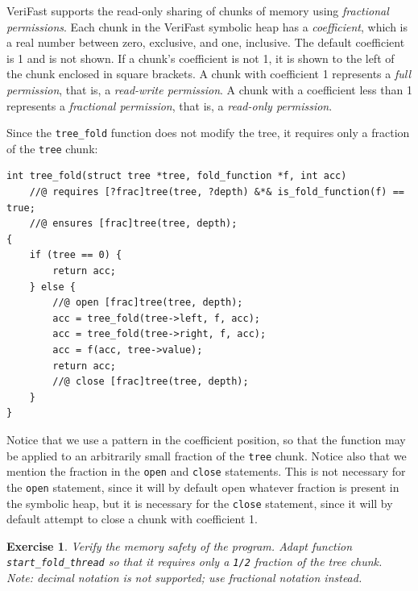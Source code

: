 \documentclass{article}
\newtheorem{exercise}{Exercise}
\begin{document}
VeriFast supports the read-only sharing of chunks of memory
using \emph{fractional permissions}. Each chunk in the VeriFast
symbolic heap has a \emph{coefficient}, which is a real number
between zero, exclusive, and one, inclusive. The default
coefficient is 1 and is not shown. If a chunk's coefficient is
not 1, it is shown to the left of the chunk enclosed in square
brackets. A chunk with coefficient 1 represents a \emph{full
permission}, that is, a \emph{read-write permission}. A chunk
with a coefficient less than 1 represents a \emph{fractional
permission}, that is, a \emph{read-only permission}.

Since the \lstinline!tree_fold! function does not modify the
tree, it requires only a fraction of the \lstinline!tree!
chunk:
\begin{lstlisting}
int tree_fold(struct tree *tree, fold_function *f, int acc)
    //@ requires [?frac]tree(tree, ?depth) &*& is_fold_function(f) == true;
    //@ ensures [frac]tree(tree, depth);
{
    if (tree == 0) {
        return acc;
    } else {
        //@ open [frac]tree(tree, depth);
        acc = tree_fold(tree->left, f, acc);
        acc = tree_fold(tree->right, f, acc);
        acc = f(acc, tree->value);
        return acc;
        //@ close [frac]tree(tree, depth);
    }
}
\end{lstlisting}
Notice that we use a pattern in the coefficient position, so
that the function may be applied to an arbitrarily small
fraction of the \lstinline!tree! chunk. Notice also that we
mention the fraction in the \lstinline!open! and
\lstinline!close! statements. This is not necessary for the
\lstinline!open! statement, since it will by default open
whatever fraction is present in the symbolic heap, but it is
necessary for the \lstinline!close! statement, since it will by
default attempt to close a chunk with coefficient 1.

\begin{exercise}\label{exercise:fractions}
Verify the memory safety of the program. Adapt function
\lstinline!start_fold_thread! so that it requires only a
\lstinline!1/2! fraction of the tree chunk. Note: decimal
notation is not supported; use fractional notation instead.
\end{exercise}
\end{document}
